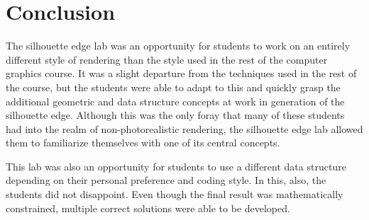 \documentclass[10pt,twocolumn]{article}
\begin{document}
\section{Conclusion}
The silhouette edge lab was an opportunity for students to work on an entirely different style of rendering than the style used in the rest of the computer graphics course.  It was a slight departure from the techniques used in the rest of the course, but the students were able to adapt to this and quickly grasp the additional geometric and data structure concepts at work in generation of the silhouette edge.  Although this was the only foray that many of these students had into the realm of non-photorealistic rendering, the silhouette edge lab allowed them to familiarize themselves with one of its central concepts.  

This lab was also an opportunity for students to use a different data structure depending on their personal preference and coding style.  In this, also, the students did not disappoint.  Even though the final result was mathematically constrained, multiple correct solutions were able to be developed.  
\end{document}
